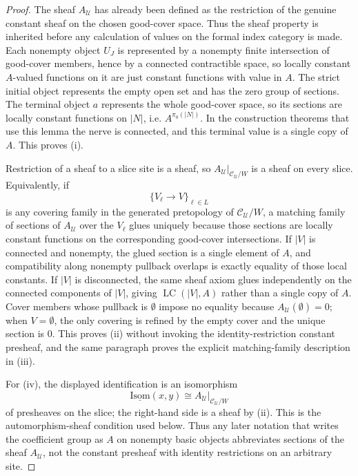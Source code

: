\begin{proof}
The sheaf \(A_{\mathcal U}\) has already been defined as the restriction
of the genuine constant sheaf on the chosen good-cover space. Thus
the sheaf property is inherited before any calculation of values on the
formal index category is made. Each nonempty object $U_J$ is represented
by a nonempty finite intersection of good-cover members, hence by a
connected contractible space, so locally constant $A$-valued functions on
it are just constant functions with value in $A$. The strict initial
object represents the empty open set and has the zero group of sections.
The terminal object \(a\) represents the whole good-cover space, so
its sections are locally constant functions on \(|N|\), i.e.
\(A^{\pi_0(|N|)}\). In the construction theorems that use this lemma the
nerve is connected, and this terminal value is a single copy of \(A\).
This proves \textup{(i)}.

Restriction of a sheaf to a slice site is a sheaf, so
$A_{\mathcal U}|_{\mathcal C_{\mathcal U}/W}$ is a sheaf on every slice.
Equivalently, if
\[
\{V_\ell\to V\}_{\ell\in L}
\]
is any covering family in the generated pretopology of
\(\mathcal C_{\mathcal U}/W\), a matching family of sections of
$A_{\mathcal U}$ over the \(V_\ell\) glues uniquely because those sections
are locally constant functions on the corresponding good-cover
intersections. If \(|V|\) is connected and nonempty, the glued section is a
single element of \(A\), and compatibility along nonempty pullback
overlaps is exactly equality of those local constants. If \(|V|\) is
disconnected, the same sheaf axiom glues independently on the connected
components of \(|V|\), giving \(\operatorname{LC}(|V|,A)\) rather than a
single copy of \(A\).
Cover members whose pullback is \(\emptyset\) impose no equality because
\(A_{\mathcal U}(\emptyset)=0\); when \(V=\emptyset\), the only covering
is refined by the empty cover and the unique section is \(0\). This proves
\textup{(ii)} without invoking the identity-restriction constant
presheaf, and the same paragraph proves the explicit matching-family
description in \textup{(iii)}.

For \textup{(iv)}, the displayed identification is an isomorphism
\[
\underline{\mathrm{Isom}}(x,y)\cong
A_{\mathcal U}|_{\mathcal C_{\mathcal U}/W}
\]
of presheaves on the slice; the right-hand side is a sheaf by
\textup{(ii)}. This is the automorphism-sheaf condition used below. Thus
any later notation that writes the coefficient group as $A$ on nonempty
basic objects abbreviates sections of the sheaf $A_{\mathcal U}$, not the
constant presheaf with identity restrictions on an arbitrary site.
\end{proof}

